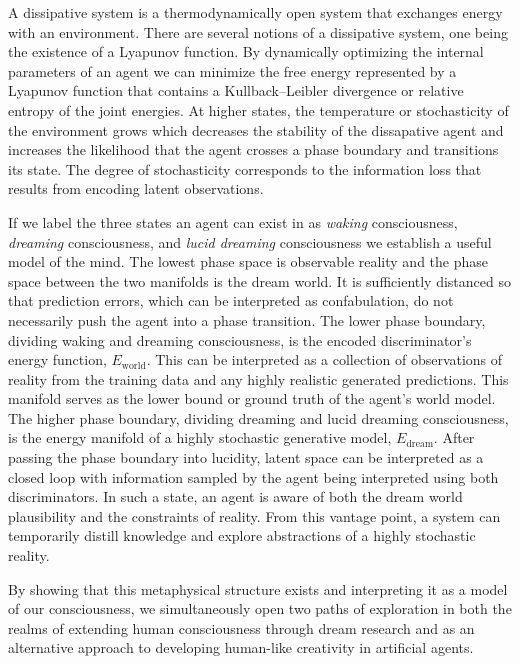 \documentclass{article}
\begin{document}
A dissipative system is a thermodynamically open system that exchanges energy with an environment. There are several notions of a dissipative system, one being the existence of a Lyapunov function. By dynamically optimizing the internal parameters of an agent we can minimize the free energy represented by a Lyapunov function that contains a Kullback–Leibler divergence or relative entropy of the joint energies. At higher states, the temperature or stochasticity of the environment grows which decreases the stability of the dissapative agent and increases the likelihood that the agent crosses a phase boundary and transitions its state. The degree of stochasticity corresponds to the information loss that results from encoding latent observations. 

If we label the three states an agent can exist in as \textit{waking} consciousness, \textit{dreaming} consciousness, and \textit{lucid dreaming} consciousness we establish a useful model of the mind. The lowest phase space is observable reality and the phase space between the two manifolds is the dream world. It is sufficiently distanced so that prediction errors, which can be interpreted as confabulation, do not necessarily push the agent into a phase transition. The lower phase boundary, dividing waking and dreaming consciousness, is the encoded discriminator's energy function, $E_{\text{world}}$. This can be interpreted as a collection of observations of reality from the training data and any highly realistic generated predictions. This manifold serves as the lower bound or ground truth of the agent's world model. The higher phase boundary, dividing dreaming and lucid dreaming consciousness, is the energy manifold of a highly stochastic generative model, $E_{\text{dream}}$.  After passing the phase boundary into lucidity, latent space can be interpreted as a closed loop with information sampled by the agent being interpreted using both discriminators. In such a state, an agent is aware of both the dream world plausibility and the constraints of reality. From this vantage point, a system can temporarily distill knowledge and explore abstractions of a highly stochastic reality. 

By showing that this metaphysical structure exists and interpreting it as a model of our consciousness, we simultaneously open two paths of exploration in both the realms of extending human consciousness through dream research and as an alternative approach to developing human-like creativity in artificial agents.
\end{document}
